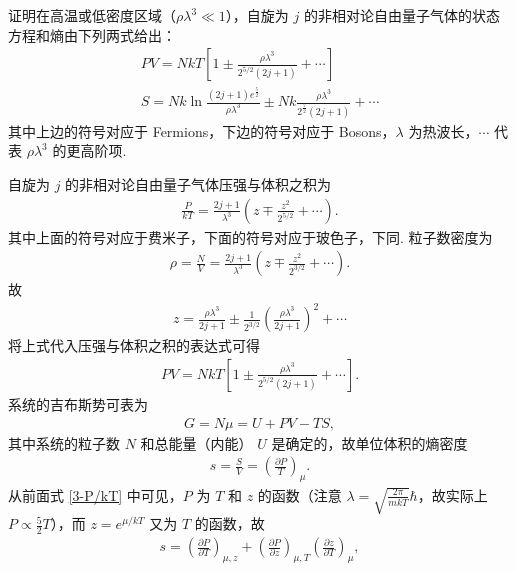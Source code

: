 \documentclass{assignment}
\begin{document}
\begin{prob}
    证明在高温或低密度区域（$\rho\lambda^3\ll 1$），自旋为 $j$ 的非相对论自由量子气体的状态方程和熵由下列两式给出：
    \begin{gather*}
        PV=NkT\left[1\pm\frac{\rho\lambda^3}{2^{5/2}(2j+1)}+\cdots\right]\\
        S=Nk\ln\frac{(2j+1)e^{\frac{5}{2}}}{\rho\lambda^3}\pm Nk\frac{\rho\lambda^3}{2^{\frac{7}{2}}(2j+1)}+\cdots
    \end{gather*}
    其中上边的符号对应于 Fermions，下边的符号对应于 Bosons，$\lambda$ 为热波长，$\cdots$ 代表 $\rho\lambda^3$ 的更高阶项.
\end{prob}
\begin{pf}
    自旋为 $j$ 的非相对论自由量子气体压强与体积之积为
    \begin{align}
        \label{3-P/kT}
        \frac{P}{kT}=\frac{2j+1}{\lambda^3}\left(z\mp\frac{z^2}{2^{5/2}}+\cdots\right).
    \end{align}
    其中上面的符号对应于费米子，下面的符号对应于玻色子，下同.
    粒子数密度为
    \begin{align}
        \label{3-rho}
        \rho=\frac{N}{V}=\frac{2j+1}{\lambda^3}\left(z\mp\frac{z^2}{2^{3/2}}+\cdots\right).
    \end{align}
    故
    \begin{align}
        z=\frac{\rho\lambda^3}{2j+1}\pm\frac{1}{2^{3/2}}\left(\frac{\rho\lambda^3}{2j+1}\right)^2+\cdots
    \end{align}
    将上式代入压强与体积之积的表达式可得
    \begin{align}
        PV=NkT\left[1\pm \frac{\rho\lambda^3}{2^{5/2}(2j+1)}+\cdots\right].
    \end{align}
    系统的吉布斯势可表为
    \begin{align}
        G=N\mu=U+PV-TS,
    \end{align}
    其中系统的粒子数 $N$ 和总能量（内能） $U$ 是确定的，故单位体积的熵密度
    \begin{align}
        s=\frac{S}{V}=\left(\frac{\partial P}{T}\right)_{\mu}.
    \end{align}
    从前面式 \eqref{3-P/kT} 中可见，$P$ 为 $T$ 和 $z$ 的函数（注意 $\lambda=\sqrt{\frac{2\pi}{mkT}}\hbar$，故实际上 $P\propto\frac{5}{2}T$），而 $z=e^{\mu/kT}$ 又为 $T$ 的函数，故
    \begin{align}
        s=\left(\frac{\partial P}{\partial T}\right)_{\mu,z}+\left(\frac{\partial P}{\partial z}\right)_{\mu,T}\left(\frac{\partial z}{\partial T}\right)_{\mu},
    \end{align}

\end{pf}
\end{document}
